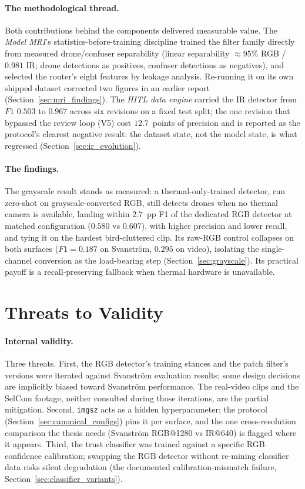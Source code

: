 \paragraph{The methodological thread.}
Both contributions behind the components delivered measurable value. The \emph{Model MRI}'s statistics-before-training discipline trained the filter family directly from measured drone/confuser separability (linear separability $\approx$95\% RGB / $0.981$ IR; drone detections as positives, confuser detections as negatives), and selected the router's eight features by leakage analysis. Re-running it on its own shipped dataset corrected two figures in an earlier report (Section~\ref{sec:mri_findings}). The \emph{HITL data engine} carried the IR detector from $F1$ $0.503$ to $0.967$ across six revisions on a fixed test split; the one revision that bypassed the review loop (V5) cost $12.7$~points of precision and is reported as the protocol's clearest negative result: the dataset state, not the model state, is what regressed (Section~\ref{sec:ir_evolution}).

\paragraph{The findings.}
The grayscale result stands as measured: a thermal-only-trained detector, run zero-shot on grayscale-converted RGB, still detects drones when no thermal camera is available, landing within $2.7$~pp F1 of the dedicated RGB detector at matched configuration ($0.580$ vs $0.607$), with higher precision and lower recall, and tying it on the hardest bird-cluttered clip. Its raw-RGB control collapses on both surfaces ($F1=0.187$ on Svanstr\"om, $0.295$ on video), isolating the single-channel conversion as the load-bearing step (Section~\ref{sec:grayscale}). Its practical payoff is a recall-preserving fallback when thermal hardware is unavailable.

\section{Threats to Validity}
\label{sec:threats}

\paragraph{Internal validity.}
Three threats. First, the RGB detector's training stances and the patch filter's versions were iterated against Svanstr\"om evaluation results; some design decisions are implicitly biased toward Svanstr\"om performance. The real-video clips and the SelCom footage, neither consulted during those iterations, are the partial mitigation. Second, \texttt{imgsz} acts as a hidden hyperparameter; the protocol (Section~\ref{sec:canonical_configs}) pins it per surface, and the one cross-resolution comparison the thesis needs (Svanstr\"om RGB@1280 vs IR@640) is flagged where it appears. Third, the trust classifier was trained against a specific RGB confidence calibration; swapping the RGB detector without re-mining classifier data risks silent degradation (the documented calibration-mismatch failure, Section~\ref{sec:classifier_variants}).

